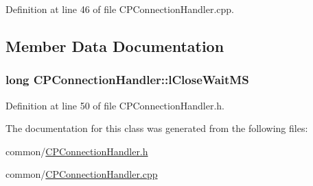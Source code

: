 \-Definition at line 46 of file \-C\-P\-Connection\-Handler.\-cpp.



\subsection{\-Member \-Data \-Documentation}
\hypertarget{class_c_p_connection_handler_a8d29ca9b1dde7b894038e70a19a9c30f}{
\subsubsection[{l\-Close\-Wait\-M\-S}]{\setlength{\rightskip}{0pt plus 5cm}long {\bf \-C\-P\-Connection\-Handler\-::l\-Close\-Wait\-M\-S}}}\label{class_c_p_connection_handler_a8d29ca9b1dde7b894038e70a19a9c30f}


\-Definition at line 50 of file \-C\-P\-Connection\-Handler.\-h.



\-The documentation for this class was generated from the following files\-:\begin{DoxyCompactItemize}
\item 
common/\hyperlink{_c_p_connection_handler_8h}{\-C\-P\-Connection\-Handler.\-h}\item 
common/\hyperlink{_c_p_connection_handler_8cpp}{\-C\-P\-Connection\-Handler.\-cpp}\end{DoxyCompactItemize}
